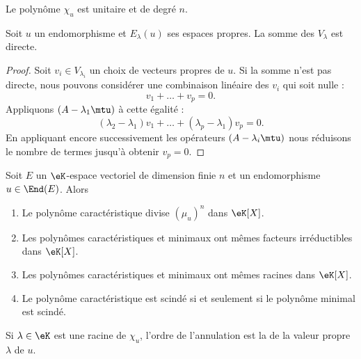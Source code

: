 \begin{lemma}
    Le polynôme \( \chi_u\) est unitaire et de degré \( n\).
\end{lemma}

\begin{lemma}       \label{LemjcztYH}
    Soit \( u\) un endomorphisme et \( E_{\lambda}(u)\) ses espaces propres. La somme des \( V_{\lambda}\) est directe.
\end{lemma}

\begin{proof}
    Soit \( v_i\in V_{\lambda_i}\) un choix de vecteurs propres de \( u\). Si la somme n'est pas directe, nous pouvons considérer une combinaison linéaire des \( v_i\) qui soit nulle :
    \begin{equation}
        v_1+\ldots+v_p=0.
    \end{equation}
    Appliquons \( (A-\lambda_1\mtu)\) à cette égalité :
    \begin{equation}
        (\lambda_2-\lambda_1)v_1+\ldots+(\lambda_p-\lambda_1)v_p=0.
    \end{equation}
    En appliquant encore successivement les opérateurs \( (A-\lambda_i\mtu)\) nous réduisons le nombre de termes jusqu'à obtenir \( v_p=0\).
\end{proof}


\begin{theorem}     \label{ThoNhbrUL}
    Soit \( E\) un \(\eK\)-espace vectoriel de dimension finie \( n\) et un endomorphisme \( u\in\End(E)\). Alors
    \begin{enumerate}
        \item
            Le polynôme caractéristique divise \( (\mu_u)^n\) dans \(\eK[X]\).
        \item
            Les polynômes caractéristiques et minimaux ont mêmes facteurs irréductibles dans \(\eK[X]\).
        \item
            Les polynômes caractéristiques et minimaux ont mêmes racines dans \(\eK[X]\).
        \item
            Le polynôme caractéristique est scindé si et seulement si le polynôme minimal est scindé.
    \end{enumerate}
\end{theorem}


Si \( \lambda\in\eK\) est une racine de \( \chi_u\), l'ordre de l'annulation est la  de la valeur propre \( \lambda\) de \( u\).

